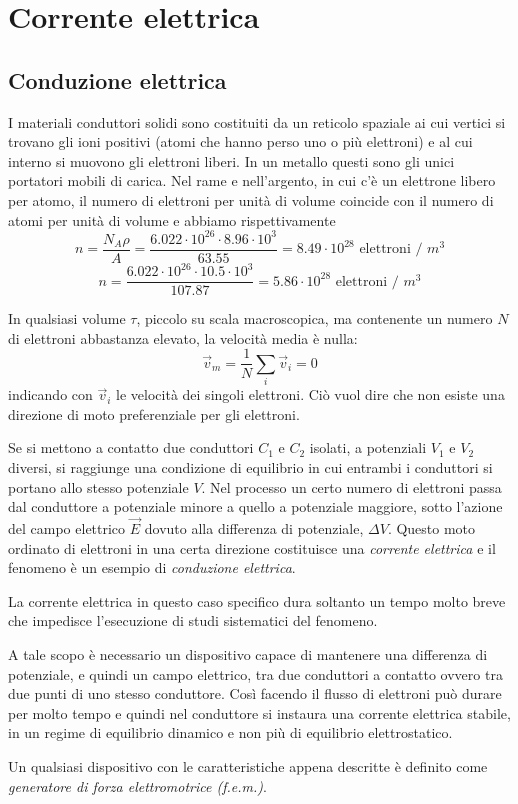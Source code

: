 \documentclass[class=book, crop=false, oneside, 12pt]{standalone}
\begin{document}
\chapter{Corrente elettrica}

\section{Conduzione elettrica}

I materiali conduttori solidi sono costituiti da un reticolo spaziale ai cui vertici si trovano gli ioni positivi (atomi che hanno perso uno o più elettroni) e al cui interno si muovono gli elettroni liberi. 
In un metallo questi sono gli unici portatori mobili di carica. 
Nel rame e nell'argento, in cui c'è un elettrone libero per atomo, il numero di elettroni per unità di volume coincide con il numero di atomi per unità di volume e abbiamo rispettivamente
\begin{equation*}
    n = \frac{N_A \rho}{A} = \frac{6.022 \cdot 10^{26} \cdot 8.96 \cdot 10^3}{63.55} = 8.49 \cdot 10^{28} \text{ elettroni / }m^3
\end{equation*}
\begin{equation*}
    n = \frac{6.022 \cdot 10^{26} \cdot 10.5 \cdot 10^3}{107.87} = 5.86 \cdot 10^{28} \text{ elettroni / }m^3
\end{equation*}

In qualsiasi volume \(\tau\), piccolo su scala macroscopica, ma contenente un numero \(N\) di elettroni abbastanza elevato, la velocità media è nulla: 
\begin{equation*}
    \overrightarrow{v}_m = \frac{1}{N} \sum_i \overrightarrow{v}_i = 0
\end{equation*}
indicando con \(\overrightarrow{v}_i\) le velocità dei singoli elettroni. 
Ciò vuol dire che non esiste una direzione di moto preferenziale per gli elettroni.

Se si mettono a contatto due conduttori \(C_1\) e \(C_2\) isolati, a potenziali \(V_1\) e \(V_2\) diversi, si raggiunge una condizione di equilibrio in cui entrambi i conduttori si portano allo stesso potenziale \(V\). 
Nel processo un certo numero di elettroni passa dal conduttore a potenziale minore a quello a potenziale maggiore, sotto l'azione del campo elettrico \(\overrightarrow{E}\) dovuto alla differenza di potenziale, \(\Delta V\). 
Questo moto ordinato di elettroni in una certa direzione costituisce una \emph{corrente elettrica} e il fenomeno è un esempio di \emph{conduzione elettrica}.

La corrente elettrica in questo caso specifico dura soltanto un tempo molto breve che impedisce l'esecuzione di studi sistematici del fenomeno. 

A tale scopo è necessario un dispositivo capace di mantenere una differenza di potenziale, e quindi un campo elettrico, tra due conduttori a contatto ovvero tra due punti di uno stesso conduttore. 
Così facendo il flusso di elettroni può durare per molto tempo e quindi nel conduttore si instaura una corrente elettrica stabile, in un regime di equilibrio dinamico e non più di equilibrio elettrostatico.

Un qualsiasi dispositivo con le caratteristiche appena descritte è definito come \emph{generatore di forza elettromotrice (f.e.m.)}.
\end{document}
